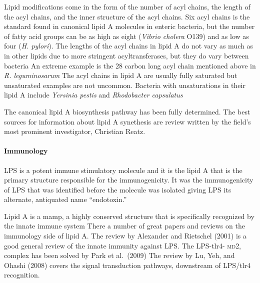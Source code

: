 Lipid modifications come in the form of the number of acyl chains, the length of the acyl chains, and the inner structure of the acyl chains. Six acyl chains is the standard found in canonical lipid A molecules in enteric bacteria, but the number of fatty acid groups can be as high as eight (\eg \textit{Vibrio cholera} O139) and as low as four (\eg \textit{H. pylori}). The lengths of the acyl chains in lipid A do not vary as much as in other lipids due to more stringent acyltransferases, but they do vary between bacteria An extreme example is the 28 carbon long acyl chain mentioned above in \textit{R. leguminosarum} The acyl chains in lipid A are usually fully saturated but unsaturated examples are not uncommon. Bacteria with unsaturations in their lipid A include \caulobacter{} \textit{Yersinia pestis} and \textit{Rhodobacter capsulatus}

The canonical lipid A biosynthesis pathway has been fully determined. The best
sources for information about lipid A synethesis are review written by the field's most prominent investigator, Christian Reatz. 

    \paragraph{Immunology}

\ac{LPS} is a potent immune stimulatory molecule and it is the lipid A that is
the primary structure responsible for the immunogenicity. It was the immunogenicity of \ac{LPS} that was identified before the molecule was isolated giving \ac{LPS} its alternate, antiquated name ``endotoxin.'' 

Lipid A is a \ac{mamp}, a highly conserved structure that is specifically recognized by the innate immune system
There a number of great papers and reviews on the immunology side of lipid A. The review by Alexander and Rietschel (2001) is a good general review of the innate immunity against \ac{LPS}. The \ac{LPS}-\ac{tlr4}- \textsc{md}2, complex has been solved by Park et al.~(2009) The review by Lu, Yeh, and Ohashi (2008) covers the signal transduction pathways, downstream of \ac{LPS}/\ac{tlr4} recognition. 

